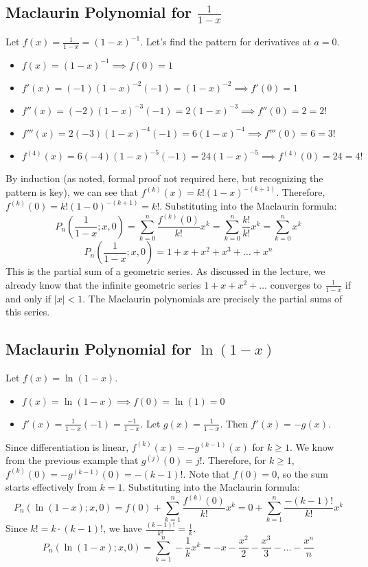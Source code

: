\documentclass[11pt]{article}
\theoremstyle{definition}
\theoremstyle{remark}
\begin{document}
\subsection{Maclaurin Polynomial for \texorpdfstring{$\frac{1}{1-x}$}{1/(1-x)}}
Let $f(x) = \frac{1}{1-x} = (1-x)^{-1}$. Let's find the pattern for derivatives at $a=0$.
\begin{itemize}
    \item $f(x) = (1-x)^{-1} \implies f(0) = 1$
    \item $f'(x) = (-1)(1-x)^{-2}(-1) = (1-x)^{-2} \implies f'(0) = 1$
    \item $f''(x) = (-2)(1-x)^{-3}(-1) = 2(1-x)^{-3} \implies f''(0) = 2 = 2!$
    \item $f'''(x) = 2(-3)(1-x)^{-4}(-1) = 6(1-x)^{-4} \implies f'''(0) = 6 = 3!$
    \item $f^{(4)}(x) = 6(-4)(1-x)^{-5}(-1) = 24(1-x)^{-5} \implies f^{(4)}(0) = 24 = 4!$
\end{itemize}
By induction (as noted, formal proof not required here, but recognizing the pattern is key), we can see that $f^{(k)}(x) = k!(1-x)^{-(k+1)}$.
Therefore, $f^{(k)}(0) = k!(1-0)^{-(k+1)} = k!$.
Substituting into the Maclaurin formula:
\[ P_n\left(\frac{1}{1-x}; x, 0\right) = \sum_{k=0}^n \frac{f^{(k)}(0)}{k!}x^k = \sum_{k=0}^n \frac{k!}{k!}x^k = \sum_{k=0}^n x^k \]
\[ P_n\left(\frac{1}{1-x}; x, 0\right) = 1 + x + x^2 + x^3 + \dots + x^n \]
This is the partial sum of a geometric series. As discussed in the lecture, we already know that the infinite geometric series $1+x+x^2+\dots$ converges to $\frac{1}{1-x}$ if and only if $|x|<1$. The Maclaurin polynomials are precisely the partial sums of this series.

\subsection{Maclaurin Polynomial for \texorpdfstring{$\ln(1-x)$}{ln(1-x)}}
Let $f(x) = \ln(1-x)$.
\begin{itemize}
    \item $f(x) = \ln(1-x) \implies f(0) = \ln(1) = 0$
    \item $f'(x) = \frac{1}{1-x}(-1) = \frac{-1}{1-x}$. Let $g(x) = \frac{1}{1-x}$. Then $f'(x) = -g(x)$.
\end{itemize}
Since differentiation is linear, $f^{(k)}(x) = -g^{(k-1)}(x)$ for $k \ge 1$.
We know from the previous example that $g^{(j)}(0) = j!$.
Therefore, for $k \ge 1$, $f^{(k)}(0) = -g^{(k-1)}(0) = -(k-1)!$.
Note that $f(0)=0$, so the sum starts effectively from $k=1$.
Substituting into the Maclaurin formula:
\[ P_n(\ln(1-x); x, 0) = f(0) + \sum_{k=1}^n \frac{f^{(k)}(0)}{k!}x^k = 0 + \sum_{k=1}^n \frac{-(k-1)!}{k!}x^k \]
Since $k! = k \cdot (k-1)!$, we have $\frac{(k-1)!}{k!} = \frac{1}{k}$.
\[ P_n(\ln(1-x); x, 0) = \sum_{k=1}^n -\frac{1}{k}x^k = -x - \frac{x^2}{2} - \frac{x^3}{3} - \dots - \frac{x^n}{n} \]
\end{document}

